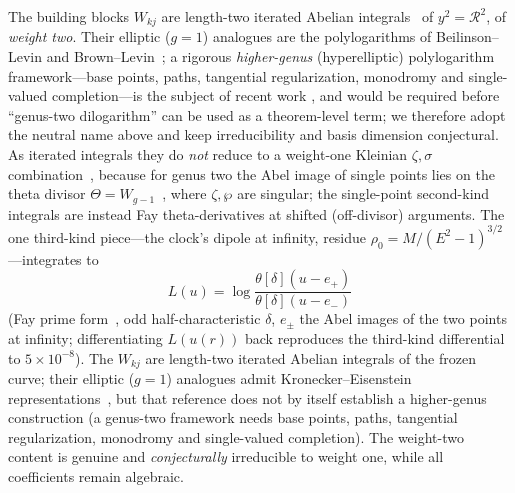 \documentclass[12pt]{iopart}
\begin{document}
The building blocks $W_{kj}$ are length-two iterated Abelian
integrals~\cite{Chen1977} of $y^2=\mathcal{R}^2$, of \emph{weight two}. Their elliptic
($g{=}1$) analogues are the polylogarithms of Beilinson--Levin and
Brown--Levin~\cite{BeilinsonLevin1994,BrownLevin2011}; a rigorous \emph{higher-genus}
(hyperelliptic) polylogarithm framework---base points, paths, tangential
regularization, monodromy and single-valued completion---is the subject of recent work
\cite{BauneEtal2024,DHokerSchlotterer2024,DHokerHiddingSchlotterer2025,DHokerEnriquezSchlottererZerbini2026},
and would be required before ``genus-two
dilogarithm'' can be used as a theorem-level term; we therefore adopt the neutral name
above and keep irreducibility and basis dimension conjectural. As iterated integrals
they do \emph{not} reduce to a weight-one Kleinian $\zeta,\sigma$
combination~\cite{BakerAbelian1897,BuchstaberEnolskii1997}, because for
genus two the Abel image of single points lies on the theta divisor
$\Theta=W_{g-1}$~\cite{MumfordTata}, where $\zeta,\wp$ are singular; the single-point
second-kind integrals are instead Fay theta-derivatives at shifted (off-divisor)
arguments. The one third-kind piece---the clock's dipole at infinity, residue
$\rho_0=M/(E^2-1)^{3/2}$---integrates to
\begin{equation}
    L(u)=\log\frac{\theta[\delta](u-e_+)}{\theta[\delta](u-e_-)}
    \label{eq:thirdkind-theta}
\end{equation}
(Fay prime form~\cite{Fay1973}, odd half-characteristic $\delta$, $e_\pm$ the Abel
images of the two points at infinity; differentiating $L(u(r))$ back reproduces the
third-kind differential to $5\times10^{-8}$). The $W_{kj}$ are length-two iterated Abelian integrals of the frozen curve; their
elliptic ($g{=}1$) analogues admit Kronecker--Eisenstein
representations~\cite{BeilinsonLevin1994}, but that reference does not by itself
establish a higher-genus construction (a genus-two framework needs base points, paths,
tangential regularization, monodromy and single-valued completion). The
weight-two content is genuine and \emph{conjecturally} irreducible to weight one, while
all coefficients remain
algebraic.
\end{document}
